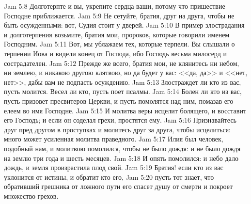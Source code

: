 \vs Jam 5:8 Долготерпте и вы, укрепите сердца ваши, потому что пришествие Господне приближается.
\vs Jam 5:9 Не сетуйте, братия, друг на друга, чтобы не быть осужденными: вот, Судия стоит у дверей.
\vs Jam 5:10 В пример злострадания и долготерпения возьмите, братия мои, пророков, которые говорили именем Господним.
\vs Jam 5:11 Вот, мы ублажаем тех, которые терпели. Вы слышали о терпении Иова и видели конец  от Господа, ибо Господь весьма милосерд и сострадателен.
\rsbpar\vs Jam 5:12 Прежде же всего, братия мои, не клянитесь ни небом, ни землею, и никакою другою клятвою, но да будет у вас: <<да, да>> и <<нет, нет>>, дабы вам не подпасть осуждению.
\rsbpar\vs Jam 5:13 Злостраждет ли кто из вас, пусть молится. Весел ли кто, пусть поет псалмы.
\vs Jam 5:14 Болен ли кто из вас, пусть призовет пресвитеров Церкви, и пусть помолятся над ним, помазав его елеем во имя Господне.
\vs Jam 5:15 И молитва веры исцелит болящего, и восставит его Господь; и если он соделал грехи, простятся ему.
\rsbpar\vs Jam 5:16 Признавайтесь друг пред другом в проступках и молитесь друг за друга, чтобы исцелиться: много может усиленная молитва праведного.
\vs Jam 5:17 Илия был человек, подобный нам, и молитвою помолился, чтобы не было дождя: и не было дождя на землю три года и шесть месяцев.
\vs Jam 5:18 И опять помолился: и небо дало дождь, и земля произрастила плод свой.
\rsbpar\vs Jam 5:19 Братия! если кто из вас уклонится от истины, и обратит кто его,
\vs Jam 5:20 пусть тот знает, что обративший грешника от ложного пути его спасет душу от смерти и покроет множество грехов.
